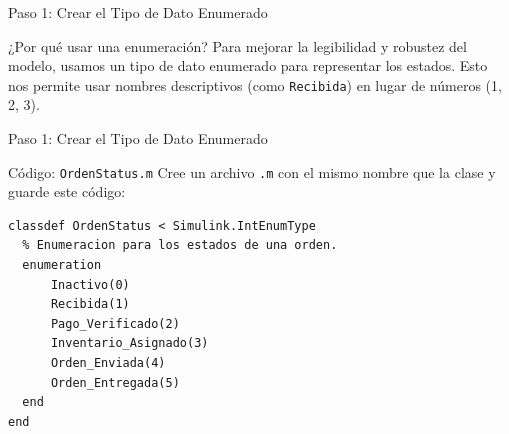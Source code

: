 \documentclass[aspectratio=169,xcolor=dvipsnames]{beamer}
\begin{document}

\begin{frame}[fragile]{Paso 1: Crear el Tipo de Dato Enumerado}
    \begin{block}{¿Por qué usar una enumeración?}
    Para mejorar la legibilidad y robustez del modelo, usamos un tipo de dato enumerado para representar los estados. Esto nos permite usar nombres descriptivos (como \texttt{Recibida}) en lugar de números (1, 2, 3).
    \end{block}

   
\end{frame}

\begin{frame}[fragile]{Paso 1: Crear el Tipo de Dato Enumerado}

 \begin{alertblock}{Código: \texttt{OrdenStatus.m}}
    Cree un archivo \texttt{.m} con el mismo nombre que la clase y guarde este código:
    \begin{lstlisting}
classdef OrdenStatus < Simulink.IntEnumType
  % Enumeracion para los estados de una orden.
  enumeration
      Inactivo(0)
      Recibida(1)
      Pago_Verificado(2)
      Inventario_Asignado(3)
      Orden_Enviada(4)
      Orden_Entregada(5)
  end
end
    \end{lstlisting}
    \end{alertblock}
\end{frame}
\end{document}
